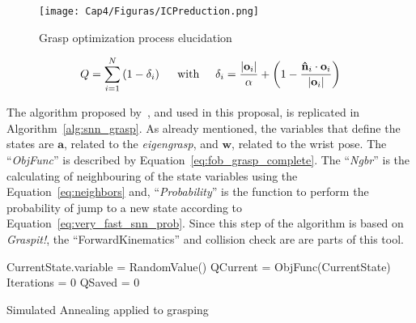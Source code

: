 \begin{figure}[h]\vspace*{0}
\centerline{\texttt{[image: Cap4/Figuras/ICPreduction.png]}}
\caption{Grasp optimization process elucidation}
\label{fig:icp_opt}
\end{figure}


\begin{equation}
Q=\sum_{i=1}^{N}\left(1-\delta_{i}\right)\hspace{0.5cm}\textnormal{with}\hspace{0.5cm}\delta_{i}=\frac{\left|\mathbf{o}_{i}\right|}{\alpha}+\left(1-\frac{\mathbf{\hat{n}}_{i} \cdot\mathbf{o}_{i}}{\left|\mathbf{o}_{i}\right|}\right)
\label{eq:fob_grasp_complete}
\end{equation}

The algorithm proposed by~\cite{Ciocarlie2009}, and used in this proposal, is replicated in Algorithm~\ref{alg:snn_grasp}.
As already mentioned, the variables that define the states are $\mathbf{a}$, related to the \textit{eigengrasp}, and $\mathbf{w}$, related to the wrist pose. The ``\textit{ObjFunc}'' is described by Equation~\ref{eq:fob_grasp_complete}. The ``\textit{Ngbr}'' is the calculating of neighbouring of the state variables using the Equation~\ref{eq:neighbors} and, ``\textit{Probability}'' is the function to perform the probability of jump to a new state according to Equation~\ref{eq:very_fast_snn_prob}. Since this step of the algorithm is based on \textit{Graspit!}, the ``ForwardKinematics'' and collision check are are parts of this tool.

\begin{algorithm}[]
 {CurrentState.variable = RandomValue()}\EndFor
 QCurrent = ObjFunc(CurrentState)\;
 Iterations = 0\;
 QSaved = 0\;
  \EndWhile
  
 \caption{Simulated Annealing applied to grasping}
 \label{alg:snn_grasp}
\end{algorithm}





